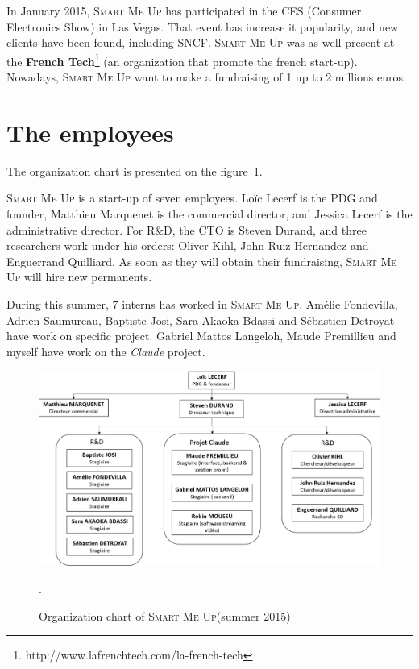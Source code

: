 \documentclass[a4paper,11pt]{custom}
\newcommand{\smu}{\textsc{Smart Me Up}\xspace}
\newcommand{\claude}{\textit{Claude}\xspace}
\begin{document}
In January 2015, \smu{} has participated in the CES (Consumer Electronics Show) in
Las Vegas. That event has increase it popularity, and new clients have been
found, including SNCF. \smu{} was as well present at the \textbf{French
Tech}\footnote{http://www.lafrenchtech.com/la-french-tech}
(an organization that promote the french start-up). Nowadays, \smu{} want to
make a fundraising of 1 up to 2 millions euros.

\section{The employees}

The organization chart is presented on the figure~\ref{fig:organigramme}.

\smu is a start-up of seven employees. Loïc Lecerf is the PDG and founder,
Matthieu Marquenet is the commercial director, and Jessica Lecerf is the
administrative director. For R\&D, the CTO is Steven Durand, and three
researchers work under his orders: Oliver Kihl, John Ruiz Hernandez and
Enguerrand Quilliard. As soon as they will obtain their fundraising, \smu{}
will hire new permanents.

During this summer, 7 interns has worked in \smu. Amélie Fondevilla, Adrien
Saumureau, Baptiste Josi, Sara Akaoka Bdassi and Sébastien Detroyat have work on
specific project. Gabriel Mattos Langeloh, Maude Premillieu and myself have work
on the \claude{} project.

\begin{figure}
  \centering
  \def\svgwidth{\columnwidth}
  \includegraphics[width=\textwidth]{organigramme.jpg}
  \label{fig:organigramme}
  \caption{Organization chart of \smu (summer 2015)}.
\end{figure}

\end{document}
